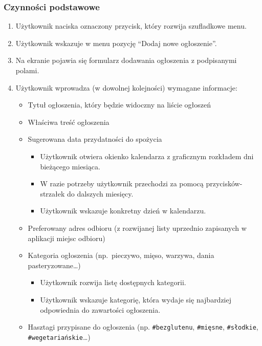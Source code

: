 \documentclass[licencjacka]{pracamgr}
\begin{document}
    \subsubsection{Czynności podstawowe}
    \begin{enumerate}
        \item Użytkownik naciska oznaczony przycisk, który rozwija szufladkowe menu.
        \item Użytkownik wskazuje w menu pozycję ``Dodaj nowe ogłoszenie''.
        \item Na ekranie pojawia się formularz dodawania ogłoszenia z podpisanymi polami.
        \item Użytkownik wprowadza (w dowolnej kolejności) wymagane informacje:
        \begin{itemize}
            \item Tytuł ogłoszenia, który będzie widoczny na liście ogłoszeń
            \item Właściwa treść ogłoszenia
            \item Sugerowana data przydatności do spożycia
            \begin{itemize}
                \item Użytkownik otwiera okienko kalendarza z graficznym rozkładem dni bieżącego miesiąca.
                \item W razie potrzeby użytkownik przechodzi za pomocą przycisków-strzałek do dalszych miesięcy.
                \item Użytkownik wskazuje konkretny dzień w kalendarzu.
            \end{itemize}
            \item Preferowany adres odbioru (z rozwijanej listy uprzednio zapisanych w aplikacji miejsc odbioru)
            \item Kategoria ogłoszenia (np.\ pieczywo, mięso, warzywa, dania pasteryzowane\ldots)
            \begin{itemize}
                \item Użytkownik rozwija listę dostępnych kategorii.
                \item Użytkownik wskazuje kategorię, która wydaje się najbardziej odpowiednia do zawartości ogłoszenia.
            \end{itemize}
            \item Hasztagi przypisane do ogłoszenia (np. \texttt{\#bezglutenu}, \texttt{\#mięsne}, \texttt{\#słodkie},\\ \texttt{\#wegetariańskie}\ldots)
            \begin{itemize}

\end{itemize}
\end{itemize}
\end{enumerate}
\end{document}
